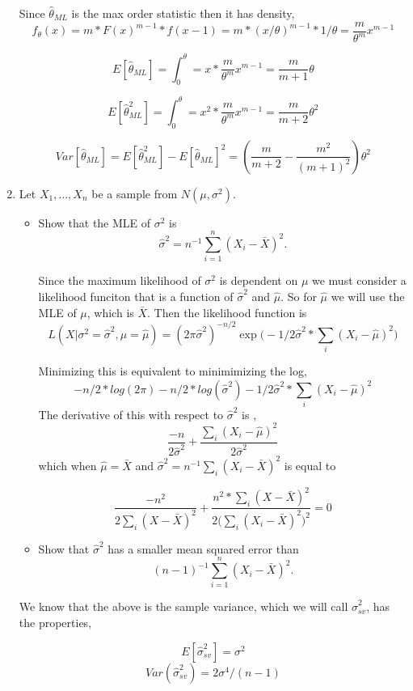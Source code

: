\documentclass{article}
\begin{document}
\begin{enumerate}
Since $\hat{\theta}_{ML}$ is the max order statistic then it has density,
\[
f_\theta(x) = m * F(x)^{m-1} * f(x-1) = m * (x/\theta)^{m-1} * 1/\theta = \frac{m}{\theta^m}x^{m-1}
\]

\[
E[\hat{\theta}_{ML}] = \int_0^\theta = x * \frac{m}{\theta^m}x^{m-1} = \frac{m}{m+1} \theta
\]

\[
E[\hat{\theta}_{ML}^2] = \int_0^\theta = x^2 * \frac{m}{\theta^m}x^{m-1} = \frac{m}{m+2} \theta ^2
\]

\[
Var[\hat\theta_{ML}] = E[\hat{\theta}_{ML}^2] - E[\hat{\theta}_{ML}]^2 = (\frac{m}{m+2} - \frac{m^2}{(m+1)^2}) \theta^2
\]

\color{black}

\item
Let $X_1, \ldots, X_n$ be a sample from $N(\mu, \sigma^2)$.
\begin{itemize}
\item Show that the MLE of $\sigma^2$ is
$${\hat\sigma}^2 = n^{-1} \sum_{i=1}^n (X_i - \bar X)^2.$$

\color{blue}
Since the maximum likelihood of $\sigma^2$ is dependent on $\mu$ we must consider a likelihood funciton that is a function of $\hat{\sigma}^2$ and $\hat{\mu}$. So for $\hat{\mu}$ we will use the MLE of $\mu$, which is $\bar{X}$. 
Then the likelihood function is 
$$
L(X | \sigma^2 = \hat{\sigma}^2, \mu = \hat{\mu}) = (2\pi \hat \sigma^2)^{-n/2} \exp\big(-1/2\hat \sigma^2 * \sum_i (X_i - \hat{\mu})^2 \big)
$$ 

Minimizing this is equivalent to minimimizing the log,
$$
-n/2 * log(2\pi) -n/2 *log(\hat\sigma^2) - 1/2 \hat\sigma^2 * \sum_i (X_i - \hat\mu)^2
$$
The derivative of this with respect to $\hat\sigma^2$ is ,
$$\frac{-n}{2\hat\sigma^2} + \frac{\sum_i (X_i - \hat\mu)^2}{2 \hat\sigma^2}$$
which when $\hat\mu = \bar{X}$ and 
$\hat\sigma^2 = n^{-1} \sum_i (X_i - \bar{X})^2$ is equal to 


$$
\frac{-n^2}{2 \sum_i (X - \bar{X})^2} + \frac{n^2 * \sum_i (X- \bar{X})^2}{2 \big(\sum_i (X_i - \bar {X})^2 \big)^2} = 0
$$

\color{black}


\item Show that ${\hat\sigma}^2$ has a smaller mean squared error than 
$$(n-1)^{-1} \sum_{i=1}^n (X_i - \bar X)^2.$$
\end{itemize}
\color{blue}
We know that the above is the sample variance, which we will call $\hat\sigma_{sv}^2$,
has the properties,

$$E[\hat\sigma^2_{sv}] = \sigma^2$$
$$Var(\hat\sigma^2_{sv}) =  2\sigma^4/(n-1)$$


\end{enumerate}
\end{document}
